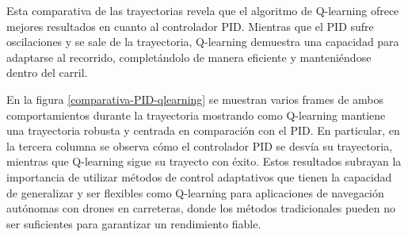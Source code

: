 Esta comparativa de las trayectorias revela que el algoritmo de Q-learning ofrece mejores resultados en cuanto al controlador PID. Mientras que el PID sufre oscilaciones y se sale de la trayectoria,
Q-learning demuestra una capacidad para adaptarse al recorrido, completándolo de manera eficiente y manteniéndose dentro del carril.


En la figura \ref{comparativa-PID-qlearning} se muestran varios frames de ambos comportamientos durante la trayectoria mostrando como Q-learning mantiene una trayectoria robusta y centrada 
en comparación con el PID. En particular, en la tercera columna se observa cómo el controlador PID se desvía su trayectoria, mientras que Q-learning sigue su trayecto con éxito. 
Estos resultados subrayan la importancia de utilizar métodos de control adaptativos que tienen la capacidad de generalizar y ser flexibles
como Q-learning para aplicaciones de navegación autónomas con drones en carreteras, donde los métodos 
tradicionales pueden no ser suficientes para garantizar un rendimiento fiable. 

